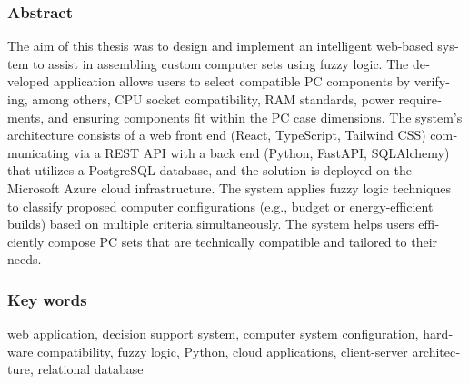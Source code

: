 \documentclass[a4paper,twoside,12pt]{book}
\newcounter{stronyPozaNumeracja}
\begin{document}
\subsubsection*{Abstract} 
\begin{otherlanguage}{british}
The aim of this thesis was to design and implement an intelligent web-based system to assist in assembling custom computer sets using fuzzy logic. The developed application allows users to select compatible PC components by verifying, among others, CPU socket compatibility, RAM standards, power requirements, and ensuring components fit within the PC case dimensions. The system’s architecture consists of a web front end (React, TypeScript, Tailwind CSS) communicating via a REST API with a back end (Python, FastAPI, SQLAlchemy) that utilizes a PostgreSQL database, and the solution is deployed on the Microsoft Azure cloud infrastructure. The system applies fuzzy logic techniques to classify proposed computer configurations (e.g., budget or energy-efficient builds) based on multiple criteria simultaneously. The system helps users efficiently compose PC sets that are technically compatible and tailored to their needs.
\end{otherlanguage}
\subsubsection*{Key words}  
\begin{otherlanguage}{british}
web application, decision support system, computer system configuration, hardware compatibility, fuzzy logic, Python, cloud applications, client-server architecture, relational database
\end{otherlanguage}




\tableofcontents

\setcounter{stronyPozaNumeracja}{\value{page}}
\mainmatter
\pagestyle{empty}

\cleardoublepage

\pagestyle{NumeryStronNazwyRozdzialow}


\end{document}
